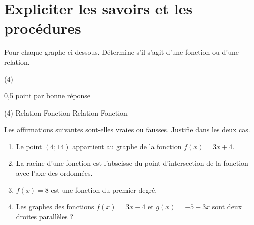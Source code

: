 \documentclass[a4paper, 12pt, parskip=half-]{scrartcl}
\begin{document}
\section*{ Expliciter les savoirs et les procédures}
\begin{connaitre}[points=1]
    Pour chaque graphe ci-dessous. Détermine s'il s'agit d'une fonction ou d'une relation.
    \begin{tasks}(4)
        \task 
        \task 
        \task 
        \task 
    \end{tasks}
\end{connaitre}
\begin{solution}
    0,5 point par bonne réponse
    \begin{tasks}(4)
        \task Relation
        \task Fonction
        \task Relation
        \task Fonction
    \end{tasks}
\end{solution}
\begin{exercise}[points=4]
    Les affirmations suivantes sont-elles vraies ou fausses. Justifie dans les deux cas.
    \begin{enumerate}
        \item Le point $(4;14)$ appartient au graphe de la fonction $f(x)=3x+4$.
        \item La racine d'une fonction est l'abscisse du point d'intersection de la fonction avec l'axe des ordonnées.
        \item $f(x) = 8$ est une fonction du premier degré.
        \item Les graphes des fonctions $f(x) = 3x - 4$ et $g(x) = -5 + 3x$ sont deux droites parallèles ?
    \end{enumerate}
\end{exercise}
\end{document}
